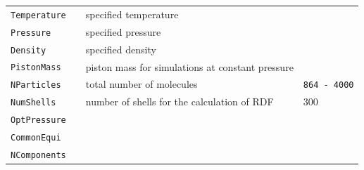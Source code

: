 \begin{landscape}
\begin{longtable}{llll}
		
		
		\midrule
		
		
		\texttt{Temperature}                &           & specified temperature                                     &   \\
		\texttt{Pressure}                   &           & specified pressure                                        &   \\
		\texttt{Density}                    &           & specified density                                         &   \\
		\texttt{PistonMass}                 &           & piston mass for simulations at constant pressure          &   \\
		\onehalfspacing \texttt{NParticles} &           & total number of molecules                                 & \texttt{864 - 4000} \\
		\midrule
		\texttt{NumShells} & & number of shells for the calculation of RDF &  300\\
		\texttt{OptPressure} & & &  \\
		\texttt{CommonEqui}  & & &   \\
		\texttt{NComponents} & & &   \\
		

\end{longtable}
\end{landscape}
